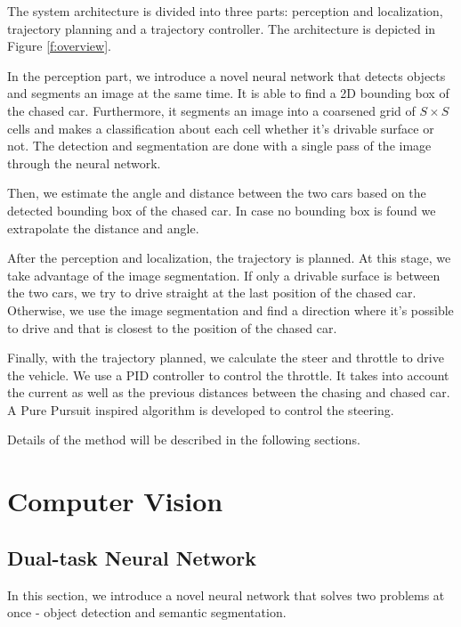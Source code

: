 \documentclass{ctuthesis/ctuthesis}
\begin{document}
The system architecture is divided into three parts: perception and localization, trajectory planning and a trajectory controller. The architecture is depicted in Figure \ref{f:overview}. \par


In the perception part, we introduce a novel neural network that detects objects and segments an image at the same time. It is able to find a 2D bounding box of the chased car. Furthermore, it segments an image into a coarsened grid of $S\times S$ cells and makes a classification about each cell whether it's drivable surface or not. The detection and segmentation are done with a single pass of the image through the neural network. \par


Then, we estimate the angle and distance between the two cars based on the detected bounding box of the chased car. In case no bounding box is found we extrapolate the distance and angle. \par


After the perception and localization, the trajectory is planned. At this stage, we take advantage of the image segmentation. If only a drivable surface is between the two cars, we try to drive straight at the last position of the chased car. Otherwise, we use the image segmentation and find a direction where it's possible to drive and that is closest to the position of the chased car. \par


Finally, with the trajectory planned, we calculate the steer and throttle to drive the vehicle. We use a PID controller \cite{PID_orig} to control the throttle. It takes into account the current as well as the previous distances between the chasing and chased car. A Pure Pursuit \cite{pure_pursuit_orig} inspired algorithm is developed to control the steering. \par

Details of the method will be described in the following sections.




\section{Computer Vision}
\subsection{Dual-task Neural Network}
In this section, we introduce a novel neural network that solves two problems at once - object detection and semantic segmentation. \par
\end{document}
